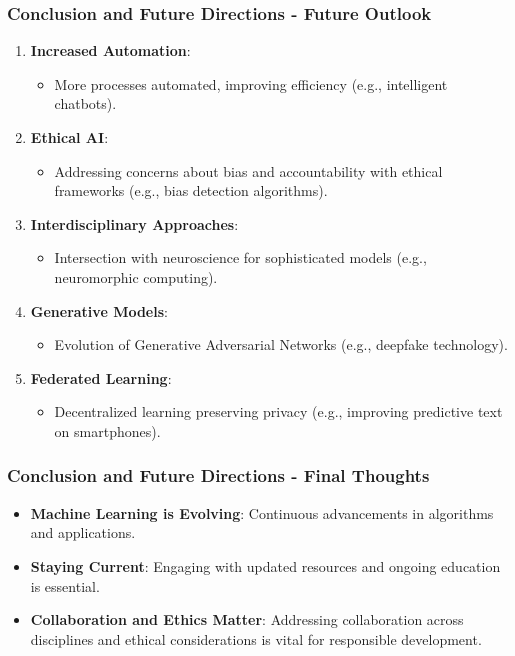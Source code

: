 \documentclass{beamer}
\begin{document}
\begin{frame}[fragile]
    \frametitle{Conclusion and Future Directions - Future Outlook}
    \begin{enumerate}
        \item \textbf{Increased Automation}:
            \begin{itemize}
                \item More processes automated, improving efficiency (e.g., intelligent chatbots).
            \end{itemize}
        \item \textbf{Ethical AI}:
            \begin{itemize}
                \item Addressing concerns about bias and accountability with ethical frameworks (e.g., bias detection algorithms).
            \end{itemize}
        \item \textbf{Interdisciplinary Approaches}:
            \begin{itemize}
                \item Intersection with neuroscience for sophisticated models (e.g., neuromorphic computing).
            \end{itemize}
        \item \textbf{Generative Models}:
            \begin{itemize}
                \item Evolution of Generative Adversarial Networks (e.g., deepfake technology).
            \end{itemize}
        \item \textbf{Federated Learning}:
            \begin{itemize}
                \item Decentralized learning preserving privacy (e.g., improving predictive text on smartphones).
            \end{itemize}
    \end{enumerate}
\end{frame}

\begin{frame}[fragile]
    \frametitle{Conclusion and Future Directions - Final Thoughts}
    \begin{itemize}
        \item \textbf{Machine Learning is Evolving}: Continuous advancements in algorithms and applications.
        \item \textbf{Staying Current}: Engaging with updated resources and ongoing education is essential.
        \item \textbf{Collaboration and Ethics Matter}: Addressing collaboration across disciplines and ethical considerations is vital for responsible development.
    \end{itemize}
\end{frame}
\end{document}

